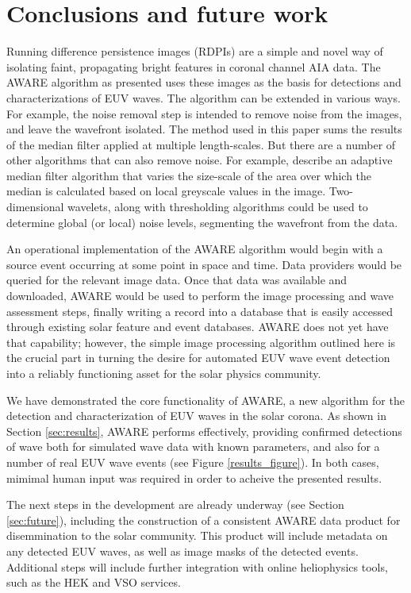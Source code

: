 \section{Conclusions and future work}\label{sec:conclusions}

Running difference persistence images (RDPIs) are a simple and novel
way of isolating faint, propagating bright features in coronal channel
AIA data.  The AWARE algorithm as presented uses these images as the
basis for detections and characterizations of EUV waves.  The
algorithm can be extended in various ways.  For example, the noise
removal step is intended to remove noise from the images, and leave
the wavefront isolated.  The method used in this paper sums the
results of the median filter applied at multiple length-scales.  But
there are a number of other algorithms that can also remove noise.
For example, \citet{2002dip..book.....G} describe an adaptive median
filter algorithm that varies the size-scale of the area over which
the median is calculated based on local greyscale values in the
image. Two-dimensional wavelets, along with thresholding algorithms
could be used to determine global (or local) noise levels, segmenting
the wavefront from the data.

An operational implementation of the AWARE algorithm would begin with
a source event occurring at some point in space and time.  Data
providers would be queried for the relevant image data.  Once that
data was available and downloaded, AWARE would be used to perform the
image processing and wave assessment steps, finally writing a record
into a database that is easily accessed through existing solar feature
and event databases.  AWARE does not yet have that capability;
however, the simple image processing algorithm outlined here is the
crucial part in turning the desire for automated EUV wave event
detection into a reliably functioning asset for the solar physics
community.

We have demonstrated the core functionality of AWARE, a new algorithm
for the detection and characterization of EUV waves in the solar
corona. As shown in Section \ref{sec:results}, AWARE performs
effectively, providing confirmed detections of wave both for simulated
wave data with known parameters, and also for a number of real EUV
wave events (see Figure \ref{results_figure}). In both cases, mimimal
human input was required in order to acheive the presented results.

The next steps in the development are already underway (see Section
\ref{sec:future}), including the construction of a consistent AWARE
data product for disemmination to the solar community. This product
will include metadata on any detected EUV waves, as well as image
masks of the detected events. Additional steps will include further
integration with online heliophysics tools, such as the HEK and VSO
services.
